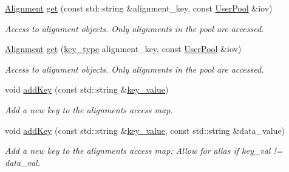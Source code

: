 \begin{DoxyCompactItemize}
\hyperlink{class_d_d4hep_1_1_alignments_1_1_alignment}{Alignment} \hyperlink{class_d_d4hep_1_1_alignments_1_1_interna_1_1_alignment_container_aaeb5bcf42da9c3e79911544e4bb512d9}{get} (const std\+::string \&alignment\+\_\+key, const \hyperlink{class_d_d4hep_1_1_conditions_1_1_user_pool}{User\+Pool} \&iov)
\begin{DoxyCompactList}\small\item\em Access to alignment objects. Only alignments in the pool are accessed. \end{DoxyCompactList}\item 
\hyperlink{class_d_d4hep_1_1_alignments_1_1_alignment}{Alignment} \hyperlink{class_d_d4hep_1_1_alignments_1_1_interna_1_1_alignment_container_ae9d28749c0b244cac8d9206fca1c06fe}{get} (\hyperlink{class_d_d4hep_1_1_alignments_1_1_interna_1_1_alignment_container_a7395f0e25d9e524d2a2bd7df0f4364e6}{key\+\_\+type} alignment\+\_\+key, const \hyperlink{class_d_d4hep_1_1_conditions_1_1_user_pool}{User\+Pool} \&iov)
\begin{DoxyCompactList}\small\item\em Access to alignment objects. Only alignments in the pool are accessed. \end{DoxyCompactList}\item 
void \hyperlink{class_d_d4hep_1_1_alignments_1_1_interna_1_1_alignment_container_a406e1b76c87e1a1929e9e7f7d27eb5ff}{add\+Key} (const std\+::string \&\hyperlink{class_d_d4hep_1_1_alignments_1_1_interna_1_1_alignment_container_a64a96ad5b67f6e67b12fd3aaaa8bbcb8}{key\+\_\+value})
\begin{DoxyCompactList}\small\item\em Add a new key to the alignments access map. \end{DoxyCompactList}\item 
void \hyperlink{class_d_d4hep_1_1_alignments_1_1_interna_1_1_alignment_container_acbb65fe1f661172f578599b4e0ef29c5}{add\+Key} (const std\+::string \&\hyperlink{class_d_d4hep_1_1_alignments_1_1_interna_1_1_alignment_container_a64a96ad5b67f6e67b12fd3aaaa8bbcb8}{key\+\_\+value}, const std\+::string \&data\+\_\+value)
\begin{DoxyCompactList}\small\item\em Add a new key to the alignments access map\+: Allow for alias if key\+\_\+val != data\+\_\+val. \end{DoxyCompactList}\end{DoxyCompactItemize}
